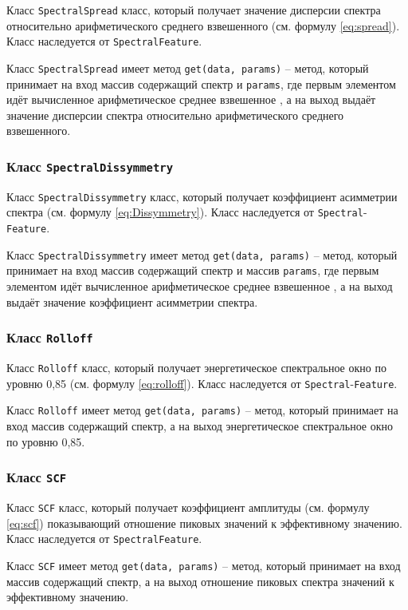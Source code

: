 Класс \texttt{SpectralSpread} класс, который получает значение дисперсии спектра относительно арифметического среднего взвешенного (см. формулу \ref{eq:spread}). Класс наследуется от \texttt{SpectralFeature}.

Класс \texttt{SpectralSpread} имеет метод \texttt{get(data, params)} --  метод, который принимает на вход массив содержащий спектр и \texttt{params}, где первым элементом идёт вычисленное арифметическое среднее взвешенное , а на выход выдаёт значение  дисперсии спектра относительно арифметического среднего взвешенного.

\subsubsection{Класс \texttt{SpectralDissymmetry}}

Класс \texttt{SpectralDissymmetry} класс, который получает коэффициент асимметрии спектра (см. формулу \ref{eq:Dissymmetry}). Класс наследуется от \texttt{Spectral}-\texttt{Feature}.

Класс \texttt{SpectralDissymmetry} имеет метод \texttt{get(data, params)} --  метод, который принимает на вход массив содержащий спектр и массив \texttt{params}, где первым элементом идёт вычисленное арифметическое среднее взвешенное , а на выход выдаёт значение коэффициент асимметрии спектра.

\subsubsection{Класс \texttt{Rolloff}}

Класс \texttt{Rolloff} класс, который получает энергетическое спектральное окно по уровню 0,85 (см. формулу \ref{eq:rolloff}). Класс наследуется от \texttt{Spectral}-\texttt{Feature}.

Класс \texttt{Rolloff} имеет метод \texttt{get(data, params)} --  метод, который принимает на вход массив содержащий спектр, а на выход энергетическое спектральное окно по уровню 0,85.

\subsubsection{Класс \texttt{SCF}}

Класс \texttt{SCF} класс, который получает коэффициент амплитуды (см. формулу \ref{eq:scf}) показывающий отношение пиковых значений к эффективному значению. Класс наследуется от \texttt{SpectralFeature}.

Класс \texttt{SCF} имеет метод \texttt{get(data, params)} --  метод, который принимает на вход массив содержащий спектр, а на выход отношение пиковых спектра значений к эффективному значению.

